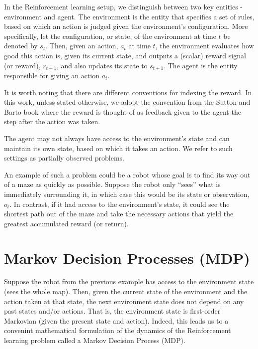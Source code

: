 \documentclass{report}
\numberwithin{equation}{section}
\numberwithin{figure}{section}
\numberwithin{table}{section}
\numberwithin{algorithm}{section}
\begin{document}
In the Reinforcement learning setup, we distinguish between two 
key entities - environment and agent. The environment is the 
entity that specifies a set of rules, based on which an action 
is judged given the environment's configuration. 
More specifically, let the configuration, or state, of the 
environment at time $t$ be denoted by $s_t$. Then, 
given an action, $a_t$ at time $t$, the environment evaluates 
how good this action is, given its 
current state, and outputs a (scalar) reward signal (or reward), 
$r_{t+1}$, and also updates its state to $s_{t+1}$. The agent 
is the entity responsible for giving an action $a_t$. 

It is worth noting that there are 
different conventions for indexing the reward. In this work, 
unless stated otherwise, 
we adopt the convention from the Sutton and Barto book 
\citep{Sutton1998} where the reward is thought of as feedback 
given to the agent the step after the action was taken.

The agent may not always have access 
to the environment's state and can maintain its own state, based 
on which it takes an action. We refer to such settings as partially 
observed problems. 

An example of such a problem could be a robot 
whose goal is to find its way out of a maze as quickly as possible.
Suppose the robot only ``sees'' what is 
immediately surrounding it, in which case this would be its state 
or observation, $o_t$. 
In contrast, if it had access to the environment's state, it could 
see the shortest path out of the maze and take the necessary actions 
that yield the greatest accumulated reward (or return).

\section{Markov Decision Processes (MDP)}
\label{sec:RLMDP}
Suppose the robot from the previous example has access to the 
environment state (sees the whole map). Then, given the 
current state of the environment 
and the action taken 
at that state, the next environment state does not depend on any 
past states and/or actions. That is, the 
environment state is first-order Markovian 
(given the present state and action). Indeed, this 
leads us to a convenint 
mathematical formulation of the dynamics of the 
Reinforcement learning problem called 
a Markov Decision Process (MDP).
\end{document}
